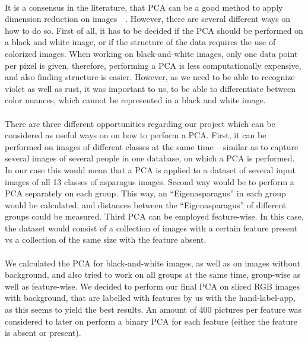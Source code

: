 \\
It is a consensus in the literature, that PCA can be a good method to apply dimension reduction on images~\citep{turk1991face}~\citep{lata2009}.
However, there are several different ways on how to do so. First of all, it has to be decided if the PCA should be performed on a black and white image, or if the structure of the data requires the use of colorized images. When working on black-and-white images, only one data point per pixel is given, therefore, performing a PCA is less computationally expensive, and also finding structure is easier. However, as we need to be able to recognize violet as well as rust, it was important to us, to be able to differentiate between color nuances, which cannot be represented in a black and white image.   \\
 \\
There are three different opportunities regarding our project which can be considered as useful ways on on how to perform a PCA. First, it can be performed on images of different classes at the same time – similar as to capture several images of several people in one database, on which a PCA is performed. In our case this would mean that a PCA is applied to a dataset of several input images of all 13 classes of asparagus images. Second way would be to perform a PCA separately on each group. This way, an “Eigenasparagus” in each group would be calculated, and distances between the “Eigenasparagus” of different groups could be measured. Third PCA can be employed feature-wise. In this case, the dataset would consist of a collection of images with a certain feature present vs a collection of the same size with the feature absent.  \\
 \\
We calculated the PCA for black-and-white images, as well as on images without background, and also tried to work on all groups at the same time, group-wise as well as feature-wise. We decided to perform our final PCA on sliced RGB images with background, that are labelled with features by us with the hand-label-app, as this seems to yield the best results. An amount of 400 pictures per feature was considered to later on perform a binary PCA for each feature (either the feature is absent or present). \\
\\
